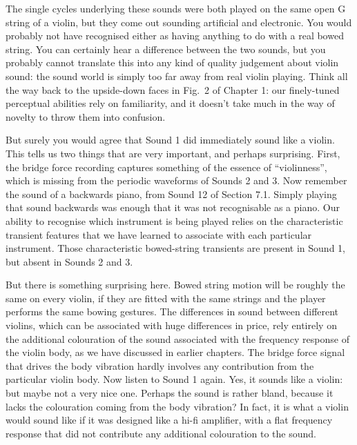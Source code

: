 

  The single cycles underlying these sounds were both played on the same open G 
  string of a violin, but they come out sounding artificial and electronic. You 
  would probably not have recognised either as having anything to do with a 
  real bowed string. You can certainly hear a difference between the two 
  sounds, but you probably cannot translate this into any kind of quality 
  judgement about violin sound: the sound world is simply too far away from 
  real violin playing. Think all the way back to the upside-down faces in Fig.\ 
  2 of Chapter 1: our finely-tuned perceptual abilities rely on familiarity, 
  and it doesn’t take much in the way of novelty to throw them into confusion. 

  But surely you would agree that Sound 1 did immediately sound like a violin. 
  This tells us two things that are very important, and perhaps surprising. 
  First, the bridge force recording captures something of the essence of 
  “violinness”, which is missing from the periodic waveforms of Sounds 2 and 3. 
  Now remember the sound of a backwards piano, from Sound 12 of Section 7.1. 
  Simply playing that sound backwards was enough that it was not recognisable 
  as a piano. Our ability to recognise which instrument is being played relies 
  on the characteristic transient features that we have learned to associate 
  with each particular instrument. Those characteristic bowed-string transients 
  are present in Sound 1, but absent in Sounds 2 and 3. 

  But there is something surprising here. Bowed string motion will be roughly 
  the same on every violin, if they are fitted with the same strings and the 
  player performs the same bowing gestures. The differences in sound between 
  different violins, which can be associated with huge differences in price, 
  rely entirely on the additional colouration of the sound associated with the 
  frequency response of the violin body, as we have discussed in earlier 
  chapters. The bridge force signal that drives the body vibration hardly 
  involves any contribution from the particular violin body. Now listen to 
  Sound 1 again. Yes, it sounds like a violin: but maybe not a very nice one. 
  Perhaps the sound is rather bland, because it lacks the colouration coming 
  from the body vibration? In fact, it is what a violin would sound like if it 
  was designed like a hi-fi amplifier, with a flat frequency response that did 
  not contribute any additional colouration to the sound. 

